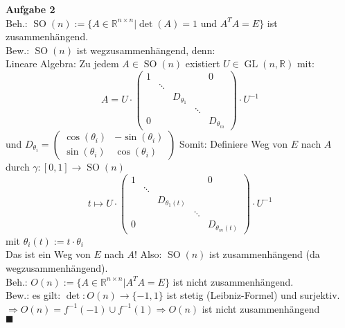 \documentclass{article}
\DeclareMathOperator{\so}{SO}
\DeclareMathOperator{\gl}{GL}
\begin{document}
\textbf{Aufgabe 2}\\
Beh.: $\so(n):=\{A\in\mathbb{R}^{n\times n}|\det(A)=1\text{ und }A^TA=E\}$ ist zusammenhängend.\\
Bew.: $\so(n)$ ist wegzusammenhängend, denn:\\
Lineare Algebra: Zu jedem $A\in\so(n)$ existiert $U\in\gl(n,\mathbb{R})$ mit:
$$A=U\cdot\left(\begin{array}{ccccc}1 & & & & 0\\ & \ddots & & & \\ & & D_{\theta_1} & & \\ & & & \ddots & \\ 0 & & & & D_{\theta_m}\end{array}\right)\cdot U^{-1}$$
und $D_{\theta_i}=\left(\begin{array}{cc}\cos(\theta_i) & -\sin(\theta_i) \\ \sin(\theta_i) & \cos(\theta_i)\end{array}\right)$ Somit: Definiere Weg von $E$ nach $A$ durch $\gamma:[0,1]\rightarrow\so(n)$ 
$$t\mapsto U\cdot \left(\begin{array}{ccccc}1 & & & & 0 \\ & \ddots & & & \\ & & D_{\theta_1(t)} & & \\ & & & \ddots & \\0 & & & & D_{\theta_m(t)}\end{array}\right)\cdot U^{-1}$$ mit $\theta_i(t):=t\cdot\theta_i$\\
Das ist ein Weg von $E$ nach $A$! Also: $\so(n)$ ist zusammenhängend (da wegzusammenhängend).\\
Beh.: $O(n):=\{A\in\mathbb{R}^{n\times n}|A^TA=E\}$ ist nicht zusammenhängend.\\
Bew.: es gilt: $\det:O(n)\rightarrow\{-1,1\}$ ist stetig (Leibniz-Formel) und surjektiv.\\
$\Rightarrow O(n)=f^{-1}(-1)\cup f^{-1}(1)\Rightarrow O(n)$ ist nicht zusammenhängend\\
$\blacksquare$\\
\end{document}
